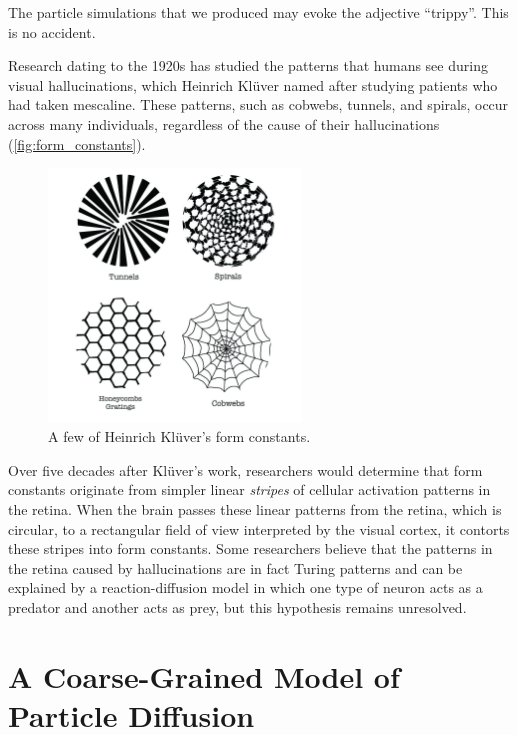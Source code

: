 The particle simulations that we produced may evoke the adjective ``trippy''. This is no accident.

Research dating to the 1920s has studied the patterns that humans see during visual hallucinations, which Heinrich Klüver named  after studying patients who had taken mescaline. These patterns, such as cobwebs, tunnels, and spirals, occur across many individuals, regardless of the cause of their hallucinations (\autoref{fig:form_constants}).\\

\begin{figure}[h]
\centering
\mySfFamily
\includegraphics[width = 0.6\textwidth]{../images_CMYK/form_constants}
\caption{A few of Heinrich Klüver's form constants.}
\label{fig:form_constants}
\end{figure}

Over five decades after Klüver's work, researchers would determine that form constants originate from simpler linear \textit{stripes} of cellular activation patterns in the retina. When the brain passes these linear patterns from the retina, which is circular, to a rectangular field of view interpreted by the visual cortex, it contorts these stripes into form constants. Some researchers believe that the patterns in the retina caused by hallucinations are in fact Turing patterns and can be explained by a reaction-diffusion model in which one type of neuron acts as a predator and another acts as prey, but this hypothesis remains unresolved.\\

\FloatBarrier
{}
\section{A Coarse-Grained Model of Particle Diffusion}
\label{sec:coarse_grained_diffusion}


